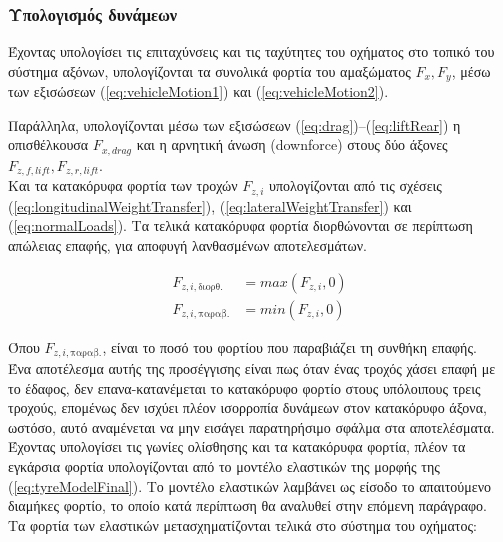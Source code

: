 \subsubsection{Υπολογισμός δυνάμεων}
\noindent
Έχοντας υπολογίσει τις επιταχύνσεις και τις ταχύτητες του οχήματος στο τοπικό του σύστημα αξόνων, υπολογίζονται τα συνολικά φορτία του αμαξώματος $F_x, F_y$, μέσω των εξισώσεων (\ref{eq:vehicleMotion1}) και (\ref{eq:vehicleMotion2}).

\noindent
Παράλληλα, υπολογίζονται μέσω των εξισώσεων (\ref{eq:drag})--(\ref{eq:liftRear}) η οπισθέλκουσα $F_{x,drag}$ και η αρνητική άνωση (downforce) στους δύο άξονες $F_{z,f,lift}, F_{z,r,lift}$.\\[5pt]

Και τα κατακόρυφα φορτία των τροχών $F_{z,i}$ υπολογίζονται από τις σχέσεις (\ref{eq:longitudinalWeightTransfer}), (\ref{eq:lateralWeightTransfer}) και (\ref{eq:normalLoads}). Τα τελικά κατακόρυφα φορτία διορθώνονται σε περίπτωση απώλειας επαφής, για αποφυγή λανθασμένων αποτελεσμάτων.

\begin{equation}
    \begin{aligned}
        F_{z,i,\text{διορθ.}} &= max(F_{z,i}, 0)\\
        F_{z,i,\text{παραβ.}} &= min(F_{z,i}, 0)
    \end{aligned}
    \label{eq:fzViolation}
\end{equation}

\noindent
Όπου $F_{z,i,\text{παραβ.}}$, είναι το ποσό του φορτίου που παραβιάζει τη συνθήκη επαφής.\\[2.5pt]

\noindent
Ένα αποτέλεσμα αυτής της προσέγγισης είναι πως όταν ένας τροχός χάσει επαφή με το έδαφος, δεν επανα-κατανέμεται το κατακόρυφο φορτίο στους υπόλοιπους τρεις τροχούς, επομένως δεν ισχύει πλέον ισορροπία δυνάμεων στον κατακόρυφο άξονα, ωστόσο, αυτό αναμένεται να μην εισάγει παρατηρήσιμο σφάλμα στα αποτελέσματα.\\[5pt]

Έχοντας υπολογίσει τις γωνίες ολίσθησης και τα κατακόρυφα φορτία, πλέον τα εγκάρσια φορτία υπολογίζονται από το μοντέλο ελαστικών της μορφής της (\ref{eq:tyreModelFinal}). Το μοντέλο ελαστικών λαμβάνει ως είσοδο το απαιτούμενο διαμήκες φορτίο, το οποίο κατά περίπτωση θα αναλυθεί στην επόμενη παράγραφο.\\[5pt]

\noindent
Τα φορτία των ελαστικών μετασχηματίζονται τελικά στο σύστημα του οχήματος:

